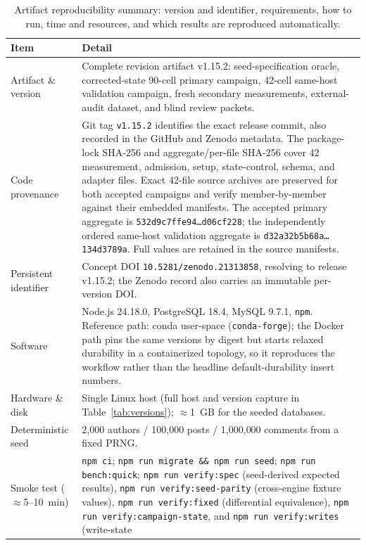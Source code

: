 \documentclass[11pt,a4paper]{article}
\begin{document}
{\small
  \begin{longtable}{@{}p{} p{}@{}}
  \caption{Artifact reproducibility summary: version and identifier, requirements, how to
    run, time and resources, and which results are reproduced automatically.}
  \label{tab:reproducibility}\\
    \toprule
    Item & Detail \\
    \midrule
    Artifact \& version & Complete revision artifact v1.15.2: seed-specification oracle, corrected-state 90-cell primary campaign, 42-cell same-host validation campaign, fresh secondary measurements, external-audit dataset, and blind review packets. \\
    Code provenance & Git tag \texttt{v1.15.2} identifies the exact release commit, also recorded in the GitHub and Zenodo metadata. The package-lock SHA-256 and aggregate/per-file SHA-256 cover 42 measurement, admission, setup, state-control, schema, and adapter files. Exact 42-file source archives are preserved for both accepted campaigns and verify member-by-member against their embedded manifests. The accepted primary aggregate is \texttt{532d9c7ffe94\ldots d06cf228}; the independently ordered same-host validation aggregate is \texttt{d32a32b5b68a\ldots 134d3789a}. Full values are retained in the source manifests. \\
    Persistent identifier & Concept DOI \texttt{10.5281/zenodo.21313858}, resolving to release v1.15.2; the Zenodo record also carries an immutable per-version DOI. \\
    Software & Node.js 24.18.0, PostgreSQL 18.4, MySQL 9.7.1, \texttt{npm}. Reference path:
      conda user-space (\texttt{conda-forge}); the Docker path pins the same versions by digest but starts relaxed durability in a containerized topology, so it reproduces the workflow rather than the headline default-durability insert numbers. \\
    Hardware \& disk & Single Linux host (full host and version capture in
      Table~\ref{tab:versions}); $\approx$1~GB for the seeded databases. \\
    Deterministic seed & 2{,}000 authors / 100{,}000 posts / 1{,}000{,}000 comments from a
      fixed PRNG. \\
    Smoke test ($\approx$5--10~min) & \texttt{npm ci}; \texttt{npm run migrate \&\& npm run
      seed}; \texttt{npm run bench:quick}; \texttt{npm run verify:spec} (seed-derived expected results), \texttt{npm run verify:seed-parity} (cross-engine fixture values), \texttt{npm run verify:fixed} (differential equivalence), \texttt{npm run verify:campaign-state}, and \texttt{npm run verify:writes} (write-state

\end{longtable}}
\end{document}
